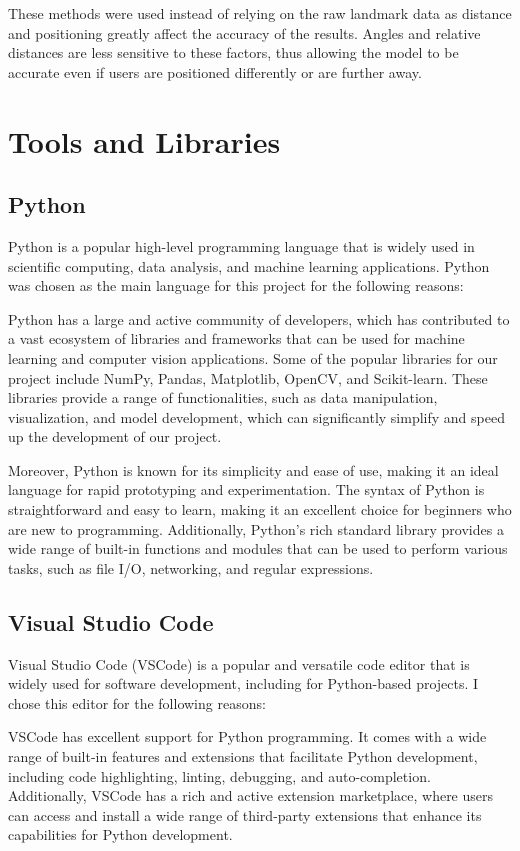 \documentclass[final,rdr32.tex]{subfiles}
\begin{document}
These methods were used instead of relying on the raw landmark data as distance and positioning greatly affect the accuracy of the results. Angles and relative distances are less sensitive to these factors, thus allowing the model to be accurate even if users are positioned differently or are further away.

\section{Tools and Libraries}

\subsection*{Python}

Python is a popular high-level programming language that is widely used in scientific computing, data analysis, and machine learning applications. Python was chosen as the main language for this project for the following reasons:

Python has a large and active community of developers, which has contributed to a vast ecosystem of libraries and frameworks that can be used for machine learning and computer vision applications. Some of the popular libraries for our project include NumPy, Pandas, Matplotlib, OpenCV, and Scikit-learn. These libraries provide a range of functionalities, such as data manipulation, visualization, and model development, which can significantly simplify and speed up the development of our project.

Moreover, Python is known for its simplicity and ease of use, making it an ideal language for rapid prototyping and experimentation. The syntax of Python is straightforward and easy to learn, making it an excellent choice for beginners who are new to programming. Additionally, Python's rich standard library provides a wide range of built-in functions and modules that can be used to perform various tasks, such as file I/O, networking, and regular expressions.


\subsection{Visual Studio Code}

Visual Studio Code (VSCode) is a popular and versatile code editor that is widely used for software development, including for Python-based projects. I chose this editor for the following reasons:

VSCode has excellent support for Python programming. It comes with a wide range of built-in features and extensions that facilitate Python development, including code highlighting, linting, debugging, and auto-completion. Additionally, VSCode has a rich and active extension marketplace, where users can access and install a wide range of third-party extensions that enhance its capabilities for Python development.
\end{document}
